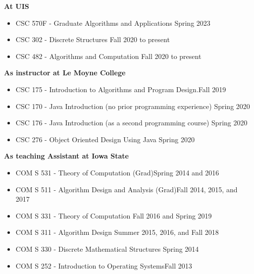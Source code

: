 \documentclass[10pt]{article}
\begin{document}
\textbf{At UIS}
\begin{itemize}
  \item[] CSC 570F - Graduate Algorithms and Applications \hfill {Spring 2023}
  \item[] CSC 302 - Discrete Structures \hfill {Fall 2020 to present}
  \item[] CSC 482 - Algorithms and Computation \hfill {Fall 2020 to present}
\end{itemize}
\textbf{As instructor at Le Moyne College}

\begin{itemize}
\item[] CSC 175 - Introduction to Algorithms and Program Design.\hfill {Fall 2019}
\item[] CSC 170 - Java Introduction (no prior programming experience) \hfill {Spring 2020}
\item[] CSC 176 - Java Introduction (as a second programming course)  \hfill {Spring 2020}
\item[] CSC 276 - Object Oriented Design Using Java \hfill{Spring 2020}
\end{itemize}
\textbf{As teaching Assistant at Iowa State}
\begin{itemize}
\item[] COM S 531 - Theory of Computation (Grad)\hfill {Spring 2014 and 2016}
\item[] COM S 511 - Algorithm Design and Analysis (Grad)\hfill {Fall 2014, 2015, and 2017}
\item[] COM S 331 - Theory of Computation \hfill {Fall 2016 and Spring 2019}
\item[] COM S 311 - Algorithm Design \hfill {Summer 2015, 2016, and Fall 2018 }
\item[] COM S 330 - Discrete Mathematical Structures \hfill {Spring 2014}
\item[] COM S 252 - Introduction to Operating Systems\hfill {Fall 2013}
\end{itemize}
\end{document}
